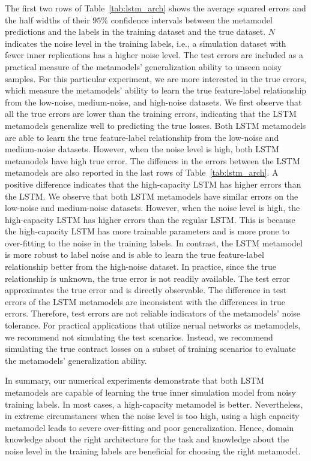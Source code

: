 The first two rows of Table~\ref{tab:lstm_arch} shows the average squared errors and the half widths of their $95\%$ confidence intervals between the metamodel predictions and the labels in the training dataset and the true dataset.
$N$ indicates the noise level in the training labels, i.e., a simulation dataset with fewer inner replications has a higher noise level.
The test errors are included as a practical measure of the metamodels' generalization ability to unseen noisy samples.
For this particular experiment, we are more interested in the true errors, which measure the metamodels' ability to learn the true feature-label relationship from the low-noise, medium-noise, and high-noise datasets.
We first observe that all the true errors are lower than the training errors, indicating that the LSTM metamodels generalize well to predicting the true losses.
Both LSTM metamodels are able to learn the true feature-label relationship from the low-noise and medium-noise datasets.
However, when the noise level is high, both LSTM metamodels have high true error.
The diffences in the errors between the LSTM metamodels are also reported in the last rows of Table~\ref{tab:lstm_arch}.
A positive difference indicates that the high-capacity LSTM has higher errors than the LSTM.
We observe that both LSTM metamodels have similar errors on the low-noise and medium-noise datasets.
However, when the noise level is high, the high-capacity LSTM has higher errors than the regular LSTM.
This is because the high-capacity LSTM has more trainable parameters and is more prone to over-fitting to the noise in the training labels.
In contrast, the LSTM metamodel is more robust to label noise and is able to learn the true feature-label relationship better from the high-noise dataset.
In practice, since the true relationship is unknown, the true error is not readily available.
The test error approximates the true error and is directly observable.
The difference in test errors of the LSTM metamodels are inconsistent with the differences in true errors.
Therefore, test errors are not reliable indicators of the metamodels' noise tolerance.
For practical applications that utilize nerual networks as metamodels, we recommend not simulating the test scenarios.
Instead, we recommend simulating the true contract losses on a subset of training scenarios to evaluate the metamodels' generalization ability.

In summary, our numerical experiments demonstrate that both LSTM metamodels are capable of learning the true inner simulation model from noisy training labels.
In most cases, a high-capacity metamodel is better.
Nevertheless, in extreme circumstances when the noise level is too high, using a high capacity metamodel leads to severe over-fitting and poor generalization.
Hence, domain knowledge about the right architecture for the task and knowledge about the noise level in the training labels are beneficial for choosing the right metamodel.

